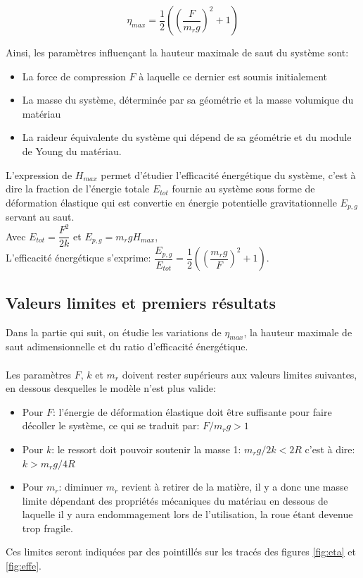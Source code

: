 \begin{equation}
\eta_{max}=\frac{1}{2}((\frac{F}{m_r g})^2+1)
 \label{eq:hmax}
\end{equation}


Ainsi, les paramètres influençant la hauteur maximale de saut du système sont:
\begin{itemize}
    \item La force de compression $F$ à laquelle ce dernier est soumis initialement
    \item La masse du système, déterminée par sa géométrie et la masse volumique du matériau
    \item La raideur équivalente du système qui dépend de sa géométrie et du module de Young du matériau.
\end{itemize}

L'expression de $H_{max}$ permet d'étudier l'efficacité énergétique du système, c'est à dire la fraction de l'énergie totale $E_{tot}$ fournie au système sous forme de déformation élastique qui est convertie en énergie potentielle gravitationnelle $E_{p,g}$ servant au saut. \\
Avec $E_{tot}=\dfrac{F^2}{2k}$ et $E_{p,g}=m_r g H_{max}$,\\
L'efficacité énergétique s'exprime:  $\dfrac{E_{p,g}}{E_{tot}}=\dfrac{1}{2}((\dfrac{m_r g}{F})^2+1)$.

\subsection{Valeurs limites et premiers résultats}
Dans la partie qui suit, on étudie les variations de $\eta_{max}$, la hauteur maximale de saut adimensionnelle et du ratio d'efficacité énergétique.
\\ 
\\ 
Les paramètres $F$, $k$ et $m_r$ doivent rester supérieurs aux valeurs limites suivantes, en dessous desquelles le modèle n'est plus valide:
\begin{itemize}
    \item Pour $F$: l'énergie de déformation élastique doit être suffisante pour faire décoller le système, ce qui se traduit par: $F/m_r g>1$
    \item Pour $k$: le ressort doit pouvoir soutenir la masse 1: $m_r g/2k<2R$ c'est à dire: $k>m_r g/4R$ 
    \item Pour $m_r$: diminuer $m_r$ revient à retirer de la matière, il y a donc une masse limite dépendant des propriétés mécaniques du matériau en dessous de laquelle il y aura endommagement lors de l'utilisation, la roue étant devenue trop fragile.
\end{itemize}
Ces limites seront indiquées par des pointillés sur les tracés des figures \ref{fig:eta} et \ref{fig:effe}.
\\

